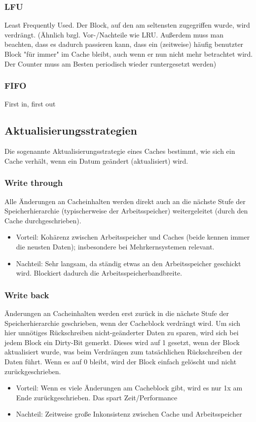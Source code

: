 		\subsubsection{LFU}
			 Least Frequently Used. Der Block, auf den am seltensten zugegriffen wurde, wird verdrängt. (Ähnlich bzgl. Vor-/Nachteile wie LRU. Außerdem muss man beachten, dass es dadurch passieren kann, dass ein (zeitweise) häufig benutzter Block "für immer" im Cache bleibt, auch wenn er nun nicht mehr betrachtet wird. Der Counter muss am Besten periodisch wieder runtergesetzt werden)
		\subsubsection{FIFO} 
			First in, first out
	\subsection{Aktualisierungsstrategien}
		Die sogenannte Aktualisierungsstrategie eines Caches bestimmt, wie sich ein Cache verhält, wenn ein Datum geändert (aktualisiert) wird.
		\subsubsection{Write through}
			Alle Änderungen an Cacheinhalten werden direkt auch an die nächste Stufe der Speicherhierarchie (typischerweise der Arbeitsspeicher) weitergeleitet (durch den Cache durchgeschrieben). \newline
			\begin{itemize}
				\item Vorteil: Kohärenz zwischen Arbeitsspeicher und Caches (beide kennen immer die neusten Daten); insbesondere bei Mehrkernsystemen relevant.
				\item Nachteil: Sehr langsam, da ständig etwas an den Arbeitsspeicher geschickt wird. Blockiert dadurch die Arbeitsspeicherbandbreite.
			\end{itemize}
		\subsubsection{Write back}
			Änderungen an Cacheinhalten werden erst zurück in die nächste Stufe der Speicherhierarchie geschrieben, wenn der Cacheblock verdrängt wird. Um sich hier unnötiges Rückschreiben nicht-geänderter Daten zu sparen, wird sich bei jedem Block ein Dirty-Bit gemerkt. Dieses wird auf 1 gesetzt, wenn der Block aktualisiert wurde, was beim Verdrängen zum tatsächlichen Rückschreiben der Daten führt. Wenn es auf 0 bleibt, wird der Block einfach gelöscht und nicht zurückgeschrieben. \newline
			\begin{itemize}
				\item Vorteil: Wenn es viele Änderungen am Cacheblock gibt, wird es nur 1x am Ende zurückgeschrieben. Das spart Zeit/Performance
				\item Nachteil: Zeitweise große Inkonsistenz zwischen Cache und Arbeitsspeicher
			\end{itemize}


